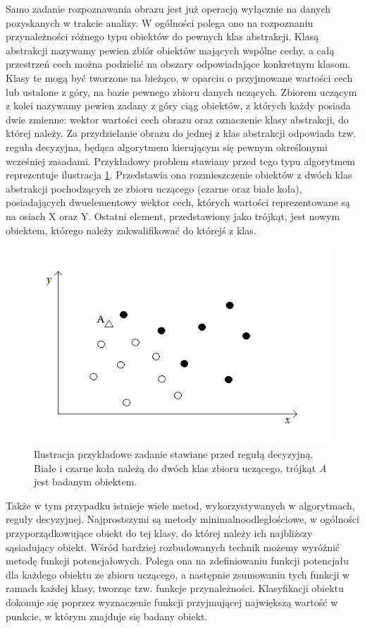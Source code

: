 Samo zadanie rozpoznawania obrazu jest już operacją wyłącznie na danych pozyskanych w trakcie analizy. W ogólności polega ono na rozpoznaniu przynależności różnego typu obiektów do pewnych klas abstrakcji\cite{Tadeusiewicz_flasinski}. Klasą abstrakcji nazywamy pewien zbiór obiektów mających wspólne cechy, a całą przestrzeń cech można podzielić na obszary odpowiadające konkretnym klasom. Klasy te mogą być tworzone na bieżąco, w oparciu o przyjmowane wartości cech lub ustalone z góry, na bazie pewnego zbioru danych uczących. Zbiorem uczącym z kolei nazywamy pewien zadany z góry ciąg obiektów, z których każdy posiada dwie zmienne: wektor wartości cech obrazu oraz oznaczenie klasy abstrakcji, do której należy\cite{Materka}. Za przydzielanie obrazu do jednej z klas abstrakcji odpowiada tzw. reguła decyzyjna, będąca algorytmem kierującym się pewnym określonymi wcześniej zasadami. Przykładowy problem stawiany przed tego typu algorytmem reprezentuje ilustracja \ref{zbior}. Przedstawia ona rozmieszczenie obiektów z dwóch klas abstrakcji pochodzących ze zbioru uczącego (czarne oraz białe koła), posiadających dwuelementowy wektor cech, których wartości reprezentowane są na osiach X oraz Y. Ostatni element, przedstawiony jako trójkąt, jest nowym obiektem, którego należy zakwalifikować do którejś z klas.\newpage

\begin{figure}[H]
\begin{center}
\includegraphics[scale=0.6]{imgs/hardtask2.png}
\caption[Przykładowe zadanie reguły decyzyjnej.]{\small{Ilustracja przykładowe zadanie stawiane przed regułą decyzyjną. Białe i czarne koła należą do dwóch klas zbioru uczącego, trójkąt \textit{A} jest badanym obiektem.}}
\label{zbior}
\end{center}
\end{figure}

Także w tym przypadku istnieje wiele metod, wykorzystywanych w algorytmach, reguły decyzyjnej. Najprostszymi są metody minimalnoodległościowe, w ogólności przyporządkowujące obiekt do tej klasy, do której należy ich najbliższy sąsiadujący obiekt. Wśród bardziej rozbudowanych technik możemy wyróżnić metodę funkcji potencjałowych. Polega ona na zdefiniowaniu funkcji potencjału dla każdego obiektu ze zbioru uczącego, a następnie zsumowaniu tych funkcji w ramach każdej klasy, tworząc tzw. funkcje przynależności. Klasyfikacji obiektu dokonuje się poprzez wyznaczenie funkcji przyjmującej największą wartość w punkcie, w którym znajduje się badany obiekt.
